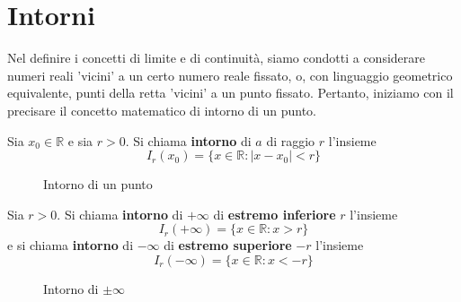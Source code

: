 \documentclass{book}
\begin{document}
\section{Intorni}
Nel definire i concetti di limite e di continuità, siamo condotti a considerare
numeri reali 'vicini' a un certo numero reale fissato, o, con linguaggio geometrico
equivalente, punti della retta 'vicini' a un punto fissato. Pertanto, iniziamo con
il precisare il concetto matematico di intorno di un punto.
\begin{definition}
    Sia $x_0 \in \mathbb{R}$ e sia $r > 0$. Si chiama \textbf{intorno} di $a$ di raggio $r$ l'insieme
    \begin{equation*}
        I_{r}(x_0) = \{x \in \mathbb{R} : |x - x_0| < r\}
    \end{equation*}
\end{definition}
\begin{figure}[H]
    \centering
    \caption{Intorno di un punto}
    \label{fig:intorno}
\end{figure}
\begin{definition}
    Sia $r > 0$. Si chiama \textbf{intorno} di $+\infty$ di \textbf{estremo inferiore} $r$ l'insieme
    \begin{equation*}
        I_{r}(+\infty) = \{x \in \mathbb{R} : x > r\}
    \end{equation*}
    e si chiama \textbf{intorno} di $-\infty$ di \textbf{estremo superiore} $-r$ l'insieme
    \begin{equation*}
        I_{r}(-\infty) = \{x \in \mathbb{R} : x < -r\}
    \end{equation*}
\end{definition}
\begin{figure}[H]
    \centering
    \caption{Intorno di \(\pm\infty\)}
    \label{fig:intornoinfinito}
\end{figure}
\end{document}
